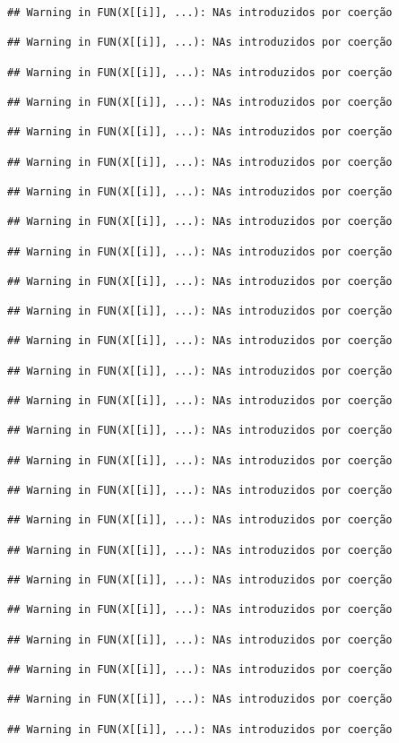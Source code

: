 \documentclass[
]{article}
\begin{document}
\begin{verbatim}
## Warning in FUN(X[[i]], ...): NAs introduzidos por coerção

## Warning in FUN(X[[i]], ...): NAs introduzidos por coerção

## Warning in FUN(X[[i]], ...): NAs introduzidos por coerção

## Warning in FUN(X[[i]], ...): NAs introduzidos por coerção

## Warning in FUN(X[[i]], ...): NAs introduzidos por coerção

## Warning in FUN(X[[i]], ...): NAs introduzidos por coerção

## Warning in FUN(X[[i]], ...): NAs introduzidos por coerção

## Warning in FUN(X[[i]], ...): NAs introduzidos por coerção

## Warning in FUN(X[[i]], ...): NAs introduzidos por coerção

## Warning in FUN(X[[i]], ...): NAs introduzidos por coerção

## Warning in FUN(X[[i]], ...): NAs introduzidos por coerção

## Warning in FUN(X[[i]], ...): NAs introduzidos por coerção

## Warning in FUN(X[[i]], ...): NAs introduzidos por coerção

## Warning in FUN(X[[i]], ...): NAs introduzidos por coerção

## Warning in FUN(X[[i]], ...): NAs introduzidos por coerção

## Warning in FUN(X[[i]], ...): NAs introduzidos por coerção

## Warning in FUN(X[[i]], ...): NAs introduzidos por coerção

## Warning in FUN(X[[i]], ...): NAs introduzidos por coerção

## Warning in FUN(X[[i]], ...): NAs introduzidos por coerção

## Warning in FUN(X[[i]], ...): NAs introduzidos por coerção

## Warning in FUN(X[[i]], ...): NAs introduzidos por coerção

## Warning in FUN(X[[i]], ...): NAs introduzidos por coerção

## Warning in FUN(X[[i]], ...): NAs introduzidos por coerção

## Warning in FUN(X[[i]], ...): NAs introduzidos por coerção

## Warning in FUN(X[[i]], ...): NAs introduzidos por coerção


\end{verbatim}
\end{document}
